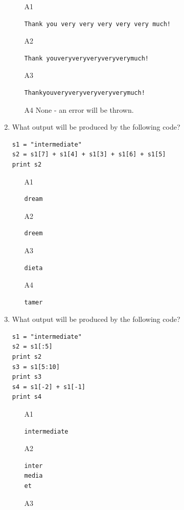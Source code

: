 \begin{enumerate}
\begin{enumerate}
\item[A1] 
\begin{verbatim}
Thank you very very very very very much!
\end{verbatim}
\item[A2] 
\begin{verbatim}
Thank youveryveryveryveryverymuch!
\end{verbatim}
\item[A3] 
\begin{verbatim}
Thankyouveryveryveryveryverymuch!
\end{verbatim}
\item[A4] None - an error will be thrown.
\end{enumerate}
\item What output will be produced by the following code?
\begin{verbatim}
s1 = "intermediate"
s2 = s1[7] + s1[4] + s1[3] + s1[6] + s1[5]
print s2
\end{verbatim}
\begin{enumerate}
\item[A1] 
\begin{verbatim}
dream
\end{verbatim}
\item[A2] 
\begin{verbatim}
dreem
\end{verbatim}
\item[A3] 
\begin{verbatim}
dieta
\end{verbatim}
\item[A4] 
\begin{verbatim}
tamer
\end{verbatim}
\end{enumerate}
\item What output will be produced by the following code?
\begin{verbatim}
s1 = "intermediate"
s2 = s1[:5]
print s2
s3 = s1[5:10]
print s3
s4 = s1[-2] + s1[-1]
print s4
\end{verbatim}
\begin{enumerate}
\item[A1] 
\begin{verbatim}
intermediate
\end{verbatim}
\item[A2] 
\begin{verbatim}
inter
media
et
\end{verbatim}
\item[A3] 
\begin{verbatim}

\end{verbatim}
\end{enumerate}
\end{enumerate}
